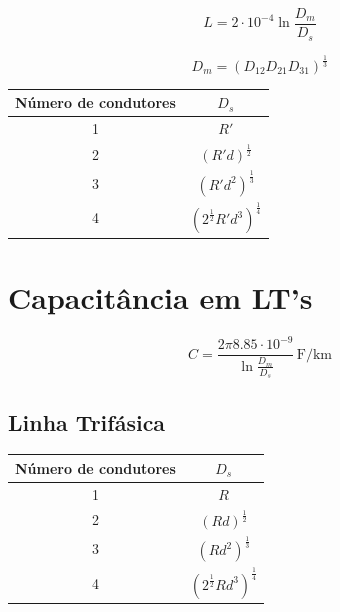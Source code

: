 \documentclass[conference]{IEEEtran}
\newcommand{\unit}[1]{\ensuremath{\, \mathrm{#1}}}
\begin{document}
\begin{equation}
L = 2 \cdot 10^{-4} \ln\frac{D_m}{D_s}
\end{equation}


\begin{equation}
D_m = (D_{12} D_{21} D_{31})^{\frac{1}{3}}
\end{equation}

\renewcommand{\arraystretch}{1.5}

\begin{center}
\begin{tabular}{|c||c|}
    \hline
    Número de condutores & $D_s$ \\
    \hline
    1 & $R'$ \\
    2 & $(R' d)^{\frac{1}{2}}$ \\
    3 & $(R' d^2)^{\frac{1}{3}}$ \\
    4 & $(2^{\frac{1}{2}} R' d^3)^{\frac{1}{4}}$ \\ 
    \hline
\end{tabular}
\end{center}


\section{\textbf{Capacitância em LT's}}


\begin{equation}
    C = \frac{2\pi 8.85 \cdot 10^{-9}}{\ln \frac{D_m}{D_s}} \unit{F/km}
\end{equation}


\subsection{Linha Trifásica}
\renewcommand{\arraystretch}{1.5}

\begin{center}
\begin{tabular}{|c||c|}
    \hline
    Número de condutores & $D_s$ \\
    \hline
    1 & $R$ \\
    2 & $(R d)^{\frac{1}{2}}$ \\
    3 & $(R d^2)^{\frac{1}{3}}$ \\
    4 & $(2^{\frac{1}{2}} R d^3)^{\frac{1}{4}}$ \\ 
    \hline
\end{tabular}
\end{center}
\end{document}

